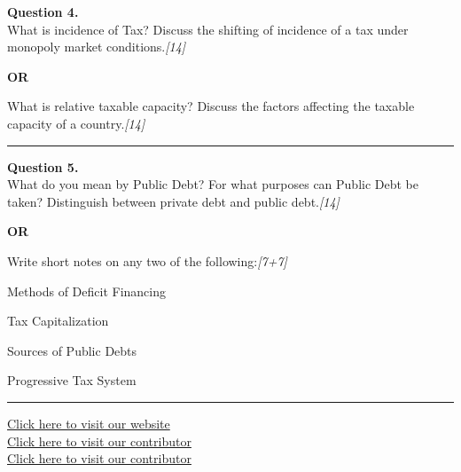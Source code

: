 \documentclass[11pt,a4paper]{article}
\newcommand{\pts}[1]{\hfill   \textit{[#1]}}
\begin{document}
\noindent   \textbf{Question 4.} \\
What is incidence of Tax? Discuss the shifting of incidence of a tax under monopoly market conditions.\pts{14}

\centerline{   \textbf{OR}}

What is relative taxable capacity? Discuss the factors affecting the taxable capacity of a country.\pts{14}

\medskip\rule{\linewidth}{0.2pt}




\noindent   \textbf{Question 5.} \\
What do you mean by Public Debt? For what purposes can Public Debt be taken? Distinguish between private debt and public debt.\pts{14}

\centerline{   \textbf{OR}}

Write short notes on any two of the following:\pts{7+7}

\begin{parts}
  \item Methods of Deficit Financing
  \item Tax Capitalization
  \item Sources of Public Debts
  \item Progressive Tax System
\end{parts}

\vfill
\rule{\linewidth}{0.4pt}

\begin{center}\small
  \href{https://bhu-exam.vercel.app/}{Click here to visit our website}\\[4pt]
  \href{https://me-aryan.vercel.app/}{Click here to visit our contributor}\\[4pt]
  \href{https://quashan-me.vercel.app/}{Click here to visit our contributor}
\end{center}
\end{document}
